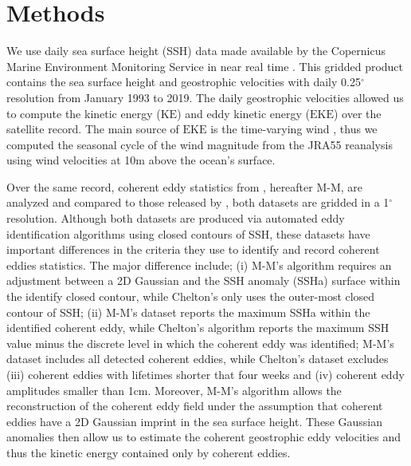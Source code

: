 \documentclass[draft,linenumbers]{agujournal2019}
\newcommand{\KE}{\textrm{KE}}
\newcommand{\EKE}{\textrm{EKE}}
\begin{document}
\section{Methods}
\label{sec:Methods}
	We use daily sea surface height (SSH) data made available by the Copernicus Marine Environment Monitoring Service in near real time \citep{CMEMS_aviso_2017}. 
	This gridded product contains the sea surface height and geostrophic velocities with daily 0.25$^\circ$ resolution from January 1993 to 2019.
	The daily geostrophic velocities allowed us to compute the kinetic energy ($\KE$) and eddy kinetic energy ($\EKE$) over the satellite record. The main source of $\EKE$ is the time-varying wind \citep{Ferrari_energy_2009}, thus we computed the seasonal cycle of the wind magnitude from the JRA55 reanalysis \citep{JMA_JRA55_2013} using wind velocities at 10m above the ocean's surface. 
	

	Over the same record, coherent eddy statistics from \citet{Martinez_TKE_2019}, hereafter M-M, are analyzed and compared to those released by \citet{Chelton_mesoscale_2013}, both datasets are gridded in a 1$^\circ$ resolution. 
	Although both datasets are produced via automated eddy identification algorithms using closed contours of SSH, these datasets have important differences in the criteria they use to identify and record coherent eddies statistics. 
	The major difference include; (i) M-M's algorithm requires an adjustment between a 2D Gaussian and the SSH anomaly (SSHa) surface within the identify closed contour, while Chelton's only uses the outer-most closed contour of SSH; (ii) M-M's dataset reports the maximum SSHa within the identified coherent eddy, while Chelton's algorithm reports the maximum SSH value minus the discrete level in which the coherent eddy was identified; M-M's dataset includes all detected coherent eddies, while Chelton's dataset excludes (iii) coherent eddies with lifetimes shorter that four weeks and (iv) coherent eddy amplitudes smaller than 1cm. Moreover, M-M's algorithm allows the reconstruction of the coherent eddy field under the assumption that coherent eddies have a 2D Gaussian imprint in the sea surface height. These Gaussian anomalies then allow us to estimate the coherent geostrophic eddy velocities and thus the kinetic energy contained only by coherent eddies.
\end{document}
